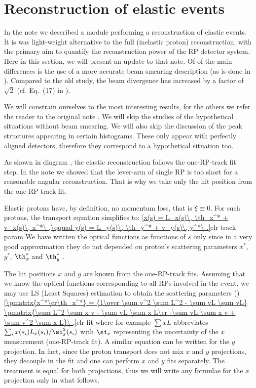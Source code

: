 \section[elr]{Reconstruction of elastic events}

In the note  we described a module performing a reconstruction of elastic events. It is was light-weight alternative to the full (inelastic proton) reconstruction, with the primary aim to quantify the reconstruction power of the RP detector system. Here in this section, we will present an update to that note. Of of the main differences is the use of a more accurate beam smearing description (as is done in ). Compared to the old study, the beam divergence has increased by a factor of $\sqrt 2$ (cf. Eq.~(17) in ).

We will constrain ourselves to the most interesting results, for the others we refer the reader to the original note . We will skip the studies of the hypothetical situations without beam smearing. We will also skip the discussion of the peak structures appearing in certain histograms. These only appear with perfectly aligned detectors, therefore they correspond to a hypothetical situation too.

As shown in diagram , the elastic reconstruction follows the one-RP-track fit step. In the note  we showed that the lever-arm of single RP is too short for a reasonable angular reconstruction. That is why we take only the hit position from the one-RP-track fit.

Elastic protons have, by definition, no momentum loss, that is $\xi \equiv 0$. For such protons, the transport equation  simplifies to:
\eqref{x(s) = L_x(s)\, \th_x^* + v_x(s)\, x^*\ ,\qquad y(s) = L_y(s)\, \th_y^* + v_y(s)\, y^*\ .}{elr track param}
We have written the optical functions as functions of $s$ only since in a very good approximation they do not depended on proton's scattering parameters $x^*$, $y^*$, $\th^*_x$ and $\th^*_y$ . 

The hit positions $x$ and $y$ are known from the one-RP-track fits. Assuming that we know the optical functions corresponding to all RPs involved in the event, we may use LS (Least Squares) estimation to obtain the scattering parameters ()
\eqref{\pmatrix{x^*\cr\th_x^*} = {1\over \sum v^2 \sum L^2 - \sum vL \sum vL} \pmatrix{\sum L^2 \sum x v - \sum vL \sum x L\cr -\sum vL \sum x v + \sum v^2 \sum x L}\ ,}{elr fit}
where for example $\sum x L$ abbreviates $\sum_{i} x(s_i) L_x(s_i) / \si_x^2(s_i)$ with $\si_x$ representing the uncertainty of the $x$ measurement (one-RP-track fit). A similar equation can be written for the $y$ projection. In fact, since the proton transport does not mix $x$ and $y$ projections, they decouple in the fit and one can perform $x$ and $y$ fits separately. The treatment is equal for both projections, thus we will write any formulae for the $x$ projection only in what follows.

